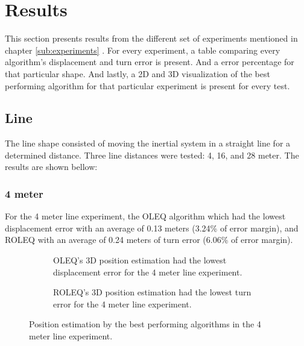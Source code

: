 \section{Results}

This section presents results from the different set of experiments mentioned in chapter \ref{sub:experiments} . For every experiment, a table comparing every algorithm's displacement and turn error is present. And a error percentage for that particular shape. And lastly, a 2D and 3D visualization of the best performing algorithm for that particular experiment is present for every test.

\subsection{Line}

The line shape consisted of moving the inertial system in a straight line for a determined distance. Three line distances were tested: 4, 16, and 28 meter. The results are shown bellow:

\subsubsection{4 meter}

For the 4 meter line experiment, the OLEQ algorithm which had the lowest displacement error with an average of 0.13 meters (3.24\% of error margin), and ROLEQ with an average of 0.24 meters of turn error (6.06\% of error margin).

\begin{figure}[!h]
    \centering
    
\end{figure}

\begin{figure}[!h]
    \centering
    \begin{subfigure}{0.49\textwidth}
        \centering
        \resizebox{1\linewidth}{!}{}
        \caption{ OLEQ's 3D position estimation had the lowest displacement error for the 4 meter line experiment. }
        \label{fig:line4_2D}
    \end{subfigure}
    \begin{subfigure}{0.49\textwidth}
        \centering
        \resizebox{1\linewidth}{!}{}
        \caption{ ROLEQ's 3D position estimation had the lowest turn error for the 4 meter line experiment. }
        \label{fig:line4_3D}
    \end{subfigure}
    \caption{Position estimation by the best performing algorithms in the 4 meter line experiment.}
    \label{fig:line4}
\end{figure}

